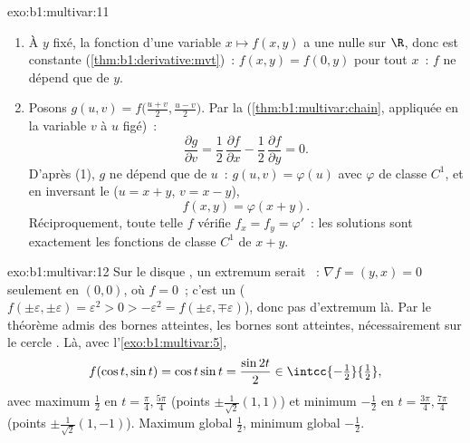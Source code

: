 \begin{solution}{exo:b1:multivar:11}
\begin{enumerate}
  \item À $y$ fixé, la fonction d'une variable $x \mapsto
        f(x,y)$ a une  nulle sur $\R$, donc est constante
        (\cref{thm:b1:derivative:mvt})~: $f(x, y) = f(0, y)$ pour
        tout $x$~: $f$ ne dépend que de $y$.
  \item Posons $g(u, v) = f\bigl(\frac{u+v}2, \frac{u-v}2\bigr)$.
        Par la 
        (\cref{thm:b1:multivar:chain}, appliquée en la variable
        $v$ à $u$ figé)~:
        \[
        \frac{\partial g}{\partial v}
        = \frac12\,\frac{\partial f}{\partial x}
        - \frac12\,\frac{\partial f}{\partial y} = 0 .
        \]
        D'après (1), $g$ ne dépend que de $u$~: $g(u, v) =
        \varphi(u)$ avec $\varphi$ de classe $C^1$, et en
        inversant le  ($u = x + y$, $v = x
        - y$),
        \[
        f(x, y) = \varphi(x + y).
        \]
        Réciproquement, toute telle $f$ vérifie $f_x = f_y =
        \varphi'$~: les solutions sont exactement les fonctions de
        classe $C^1$ de $x + y$.
\end{enumerate}
\end{solution}

\begin{solution}{exo:b1:multivar:12}
Sur le disque , un extremum serait ~: $\nabla f = (y,
x) = 0$ seulement en $(0,0)$, où $f = 0$~; c'est un  ($f(\pm
\varepsilon, \pm\varepsilon) = \varepsilon^2 > 0 > -\varepsilon^2
= f(\pm\varepsilon, \mp\varepsilon)$), donc pas d'extremum là. Par
le théorème admis des bornes atteintes, les bornes sont atteintes,
nécessairement sur le cercle . Là, avec
l'\cref{exo:b1:multivar:5},
\[
f(\cos t, \sin t) = \cos t\sin t = \frac{\sin 2t}{2}
\in \intcc{-\tfrac12}{\tfrac12},
\]
avec maximum $\frac12$ en $t = \frac\pi4, \frac{5\pi}4$ (points
$\pm\frac{1}{\sqrt2}(1,1)$) et minimum $-\frac12$ en $t =
\frac{3\pi}4, \frac{7\pi}4$ (points $\pm\frac{1}{\sqrt2}(1,-1)$).
Maximum global $\frac12$, minimum global $-\frac12$.
\end{solution}

